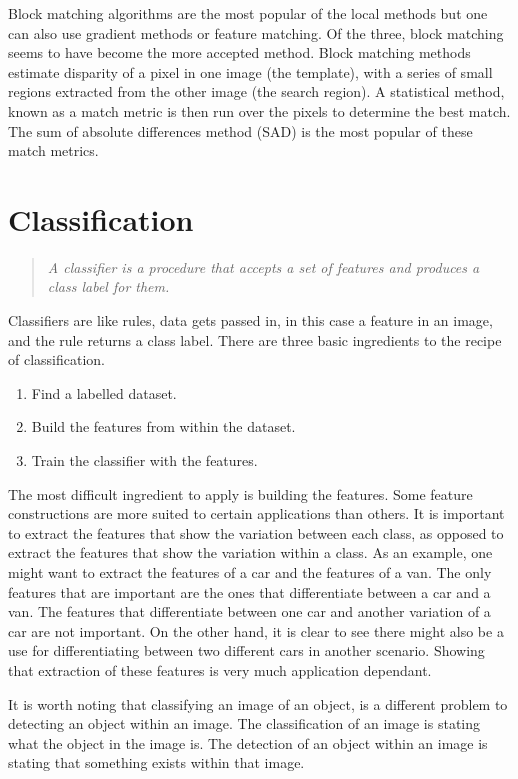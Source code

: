 \documentclass[11pt,oneside]{report}
\begin{document}
					Block matching algorithms are the most popular of the local methods but one can also use gradient methods or feature matching.
					Of the three, block matching seems to have become the more accepted method.
					Block matching methods estimate disparity of a pixel in one image (the template), with a series of small regions extracted from the other image (the search region).
					A statistical method, known as a match metric is then run over the pixels to determine the best match.
					The sum of absolute differences method (SAD) is the most popular of these match metrics\cite{journal:matchers}.
			\section{Classification}
				\begin{quote}
					\textit{A classifier is a procedure that accepts a set of features and produces a class label for them.}
					\cite[p. 487]{book:modern}
				\end{quote}
				Classifiers are like rules, data gets passed in, in this case a feature in an image, and the rule returns a class label.
				There are three basic ingredients to the recipe of classification.
				\begin{enumerate}
					\item{Find a labelled dataset.}
					\item{Build the features from within the dataset.}
					\item{Train the classifier with the features.}
				\end{enumerate}
				The most difficult ingredient to apply is building the features.
				Some feature constructions are more suited to certain applications than others.
				It is important to extract the features that show the variation between each class, as opposed to extract the features that show the variation within a class.
				As an example, one might want to extract the features of a car and the features of a van.
				The only features that are important are the ones that differentiate between a car and a van.
				The features that differentiate between one car and another variation of a car are not important.
				On the other hand, it is clear to see there might also be a use for differentiating between two different cars in another scenario.
				Showing that extraction of these features is very much application dependant.
				
				It is worth noting that classifying an image of an object, is a different problem to detecting an object within an image.
				The classification of an image is stating what the object in the image is.
				The detection of an object within an image is stating that something exists within that image.
\end{document}
